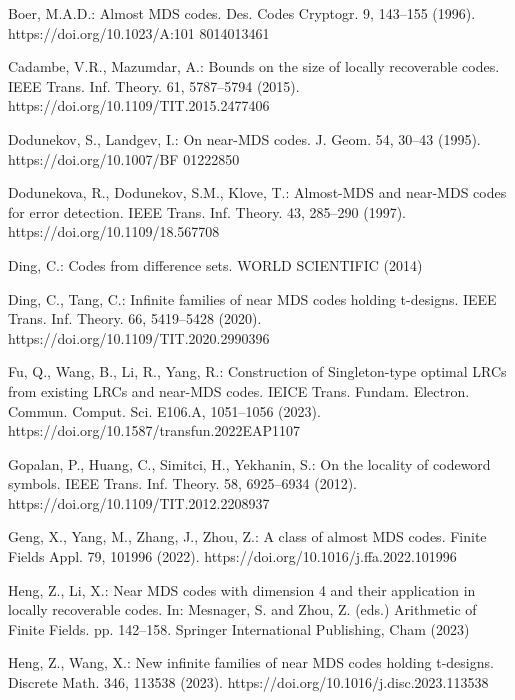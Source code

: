 \documentclass[10pt]{article}%
\begin{document}
	\begin{thebibliography}{}
		
		 Boer, M.A.D.: Almost MDS codes. Des. Codes Cryptogr. 9, 143–155 (1996). https://doi.org/10.1023/A:101 8014013461
		
		 Cadambe, V.R., Mazumdar, A.: Bounds on the size of locally recoverable codes. IEEE Trans. Inf. Theory. 61, 5787–5794 (2015). https://doi.org/10.1109/TIT.2015.2477406
		
		 Dodunekov, S., Landgev, I.: On near-MDS codes. J. Geom. 54, 30–43 (1995). https://doi.org/10.1007/BF 01222850
		
		 Dodunekova, R., Dodunekov, S.M., Klove, T.: Almost-MDS and near-MDS codes for error detection. IEEE Trans. Inf. Theory. 43, 285–290 (1997). https://doi.org/10.1109/18.567708
		
		 Ding, C.: Codes from difference sets. WORLD SCIENTIFIC (2014)
		
		 Ding, C., Tang, C.: Infinite families of near MDS codes holding t-designs. IEEE Trans. Inf. Theory. 66, 5419–5428 (2020). https://doi.org/10.1109/TIT.2020.2990396
		
		 Fu, Q., Wang, B., Li, R., Yang, R.: Construction of Singleton-type optimal LRCs from existing LRCs and near-MDS codes. IEICE Trans. Fundam. Electron. Commun. Comput. Sci. E106.A, 1051–1056 (2023). https://doi.org/10.1587/transfun.2022EAP1107
		
		 Gopalan, P., Huang, C., Simitci, H., Yekhanin, S.: On the locality of codeword symbols. IEEE Trans. Inf. Theory. 58, 6925–6934 (2012). https://doi.org/10.1109/TIT.2012.2208937
		
		 Geng, X., Yang, M., Zhang, J., Zhou, Z.: A class of almost MDS codes. Finite Fields Appl. 79, 101996 (2022). https://doi.org/10.1016/j.ffa.2022.101996
		
		 Heng, Z., Li, X.: Near MDS codes with dimension 4 and their application in locally recoverable codes. In: Mesnager, S. and Zhou, Z. (eds.) Arithmetic of Finite Fields. pp. 142–158. Springer International Publishing, Cham (2023)
		
		 Heng, Z., Wang, X.: New infinite families of near MDS codes holding t-designs. Discrete Math. 346, 113538 (2023). https://doi.org/10.1016/j.disc.2023.113538
		

\end{thebibliography}
\end{document}
